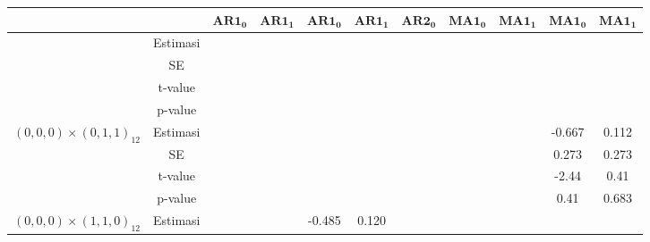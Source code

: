 \begin{enumerate}[label=\alph*.]
\begin{longtable}{|c|c|c|c|c|c|c|c|c|c|c|}
            & &
            $\mathbf{AR1_0}$ & $\mathbf{AR1_1}$ &
            $\mathbf{AR1_0}$ & $\mathbf{AR1_1}$ & $\mathbf{AR2_0}$ &
            $\mathbf{MA1_0}$ & $\mathbf{MA1_1}$ &
            $\mathbf{MA1_0}$ & $\mathbf{MA1_1}$ \\
            \hline
            \endhead

            \hline
            \endfoot
            \hline
            \endlastfoot

            \multirow{4}{*}{$(0,0,0)\times(0,1,0)_{12}$}
            & Estimasi
            & {} & {}
            & {} & {} & {}
            & {} & {}
            & {} & {} \\ \cline{2-11}

            & SE
            & {} & {}
            & {} & {} & {}
            & {} & {}
            & {} & {} \\ \cline{2-11}

            & t-value
            & {} & {}
            & {} & {} & {}
            & {} & {}
            & {} & {} \\ \cline{2-11}

            & p-value
            & {} & {}
            & {} & {} & {}
            & {} & {}
            & {} & {} \\ \hline

            \multirow{4}{*}{$(0,0,0)\times(0,1,1)_{12}$}
            & Estimasi
            & {} & {}
            & {} & {} & {}
            & {} & {}
            & {-0.667} & {0.112} \\ \cline{2-11}

            & SE
            & {} & {}
            & {} & {} & {}
            & {} & {}
            & {0.273} & {0.273} \\ \cline{2-11}

            & t-value
            & {} & {}
            & {} & {} & {}
            & {} & {}
            & {-2.44} & {0.41} \\ \cline{2-11}

            & p-value
            & {} & {}
            & {} & {} & {}
            & {} & {}
            & {0.41} & {0.683} \\ \hline

            \multirow{4}{*}{$(0,0,0)\times(1,1,0)_{12}$}
            & Estimasi
            & {} & {}
            & {-0.485} & {0.120} & {}
            & {} & {}
            & {} & {} \\ \cline{2-11}


\end{longtable}
\end{enumerate}

